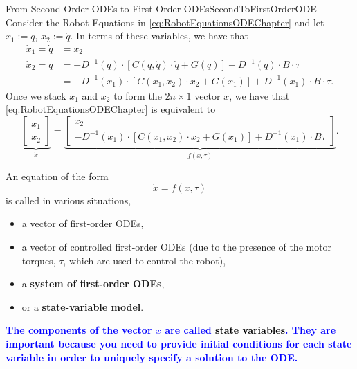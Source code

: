 \begin{methodColor}{From Second-Order ODEs to First-Order ODEs}{SecondToFirstOrderODE}
Consider the Robot Equations in \eqref{eq:RobotEquationsODEChapter} and let $x_1:=q$, $x_2 := \dot{q}$. In terms of these variables, we have that
\begin{equation}
    \begin{aligned}
        \dot{x}_1 = \dot{q} &= x_2 \\[1em]
        \dot{x}_2 = \ddot{q} &= -D^{-1}(q) \cdot \left[ C(q, \dot{q}) \cdot \dot{q} + G(q) \right] + D^{-1}(q) \cdot B \cdot \tau\\[1em]
        & =  -D^{-1}(x_1) \cdot \left[ C(x_1, x_2) \cdot x_2 + G(x_1) \right] + D^{-1}(x_1) \cdot B \cdot \tau.
    \end{aligned}
\end{equation}
Once we stack $x_1$ and $x_2$ to form the $2n \times 1$ vector $x$, we have that \eqref{eq:RobotEquationsODEChapter} is equivalent to 
\begin{equation}
\label{eq:robotEquationsFirstOrderForm}
    \underbrace{ \left[ \begin{array}{c} \dot{x}_1 \\ \dot{x}_2 \end{array} \right]}_{\dot{x}} = \underbrace{\left[\begin{array}{c} x_2 \\-D^{-1}(x_1) \cdot \left[ C(x_1, x_2) \cdot x_2 + G(x_1)\right] +  D^{-1}(x_1) \cdot B \tau\end{array} \right] }_{f(x, \tau)}.
\end{equation}

\bigskip
An equation of the form 
\begin{equation}
    \dot{x} = f(x, \tau)
\end{equation}
is called in various situations, 
\begin{itemize}
    \item a vector of first-order ODEs,
    \item a vector of controlled first-order ODEs (due to the presence of the motor torques, $\tau$, which are used to control the robot),
    \item a \textbf{system of first-order ODEs},
    \item or a \textbf{state-variable model}.
\end{itemize}
\textcolor{blue}{\bf The components of the vector $x$ are called \textcolor{black}{\bf state variables}. They are important because you need to provide initial conditions for each state variable in order to uniquely specify a solution to the ODE.}


\end{methodColor}
